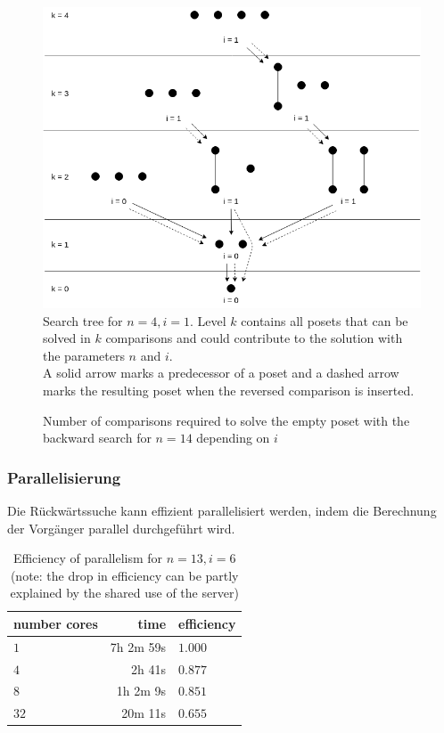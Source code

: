 \documentclass[10pt,journal,compsoc]{IEEEtran}
\begin{document}
\begin{figure}
  \centering
  \includegraphics[width=\columnwidth]{figures/backward-searchtree.png}
  \caption{Search tree for $n = 4, i = 1$.
    Level $k$ contains all posets that can be solved in $k$ comparisons and could contribute to the solution with the parameters $n$ and $i$. \\
    A solid arrow marks a predecessor of a poset and a dashed arrow marks the resulting poset when the reversed comparison is inserted.}
  \label{fig:backward-search-tree}
\end{figure}


\begin{figure}
  \centering
  
  \caption{Number of comparisons required to solve the empty poset with the backward search for $n = 14$ depending on $i$}
  \label{fig:backward-posets-per-level}
\end{figure}

\subsubsection{Parallelisierung} \label{sec:backward:parallelisation}
Die Rückwärtssuche kann effizient parallelisiert werden, indem die Berechnung der Vorgänger parallel durchgeführt wird.

\begin{table}
  \begin{tabular}{l|r|l}
    number cores & time      & efficiency \\
    \hline
    $1$          & 7h 2m 59s & $1.000$    \\
    $4$          & 2h 41s    & $0.877$    \\
    $8$          & 1h 2m 9s  & $0.851$    \\
    $32$         & 20m 11s   & $0.655$    \\
  \end{tabular}
  \centering
  \caption{Efficiency of parallelism for $n = 13, i = 6$ (note: the drop in efficiency can be partly explained by the shared use of the server)}
  \label{table:backward-parallel}
\end{table}
\end{document}
